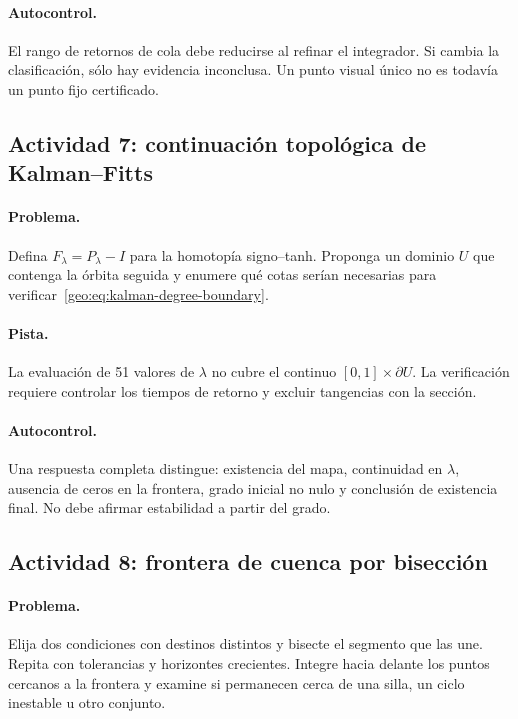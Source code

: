 \paragraph{Autocontrol.}
El rango de retornos de cola debe reducirse al refinar el integrador. Si cambia
la clasificación, sólo hay evidencia inconclusa. Un punto visual único no es
todavía un punto fijo certificado.

\subsection{Actividad 7: continuación topológica de Kalman--Fitts}

\paragraph{Problema.}
Defina \(F_\lambda=P_\lambda-I\) para la homotopía signo--tanh. Proponga un
dominio \(U\) que contenga la órbita seguida y enumere qué cotas serían
necesarias para verificar~\eqref{geo:eq:kalman-degree-boundary}.

\paragraph{Pista.}
La evaluación de 51 valores de \(\lambda\) no cubre el continuo
\([0,1]\times\partial U\). La verificación requiere controlar los tiempos de
retorno y excluir tangencias con la sección.

\paragraph{Autocontrol.}
Una respuesta completa distingue: existencia del mapa, continuidad en
\(\lambda\), ausencia de ceros en la frontera, grado inicial no nulo y
conclusión de existencia final. No debe afirmar estabilidad a partir del grado.

\subsection{Actividad 8: frontera de cuenca por bisección}

\paragraph{Problema.}
Elija dos condiciones con destinos distintos y bisecte el segmento que las
une. Repita con tolerancias y horizontes crecientes. Integre hacia delante los
puntos cercanos a la frontera y examine si permanecen cerca de una silla, un
ciclo inestable u otro conjunto.

